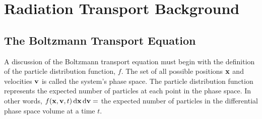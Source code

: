 \documentclass[../doc.tex]{subfiles}
\begin{document}
\chapter{Radiation Transport Background} \label{chap:transport}
\section{The Boltzmann Transport Equation}
A discussion of the Boltzmann transport equation must begin with the definition of the particle distribution function, $f$. 
The set of all possible positions $\boldsymbol{\mathrm{x}}$ and velocities $\boldsymbol{\mathrm{v}}$ is called the system's phase space. The particle distribution function represents the expected number of particles at each point in the phase space. In other words, $f(\boldsymbol{\mathrm{x}},\boldsymbol{\mathrm{v}},t) \mathop{}\!\mathrm{d} \boldsymbol{\mathrm{x}} \mathop{}\!\mathrm{d} \boldsymbol{\mathrm{v}} = $ the expected number of particles in the differential phase space volume at a time $t$. 
\end{document}
